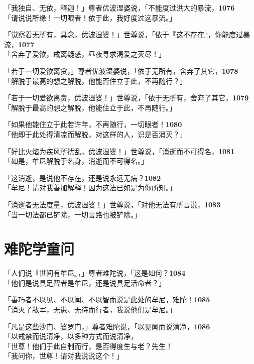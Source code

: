 「我独自、无依，释迦！」尊者优波湿婆说，「不能度过洪大的暴流，\hfill{\grayfootnotesize \textbf{1076}} \\
「请说说所缘！一切眼者！依于此，我好度过这暴流。」


「觉察着无所有，具念，优波湿婆！」世尊说，「依于『这不存在』，你能度过暴流，\hfill{\grayfootnotesize \textbf{1077}} \\
「舍弃了爱欲，戒离疑惑，昼夜寻求渴爱之灭尽！」


「若于一切爱欲离贪，」尊者优波湿婆说，「依于无所有，舍弃了其它，\hfill{\grayfootnotesize \textbf{1078}} \\
「解脱于最高的想之解脱，他能否住立于此，不再随行？」


「若于一切爱欲离贪，优波湿婆！」世尊说，「依于无所有，舍弃了其它，\hfill{\grayfootnotesize \textbf{1079}} \\
「解脱于最高的想之解脱，他能住立于此，不再随行。」


「如果他能住立于此若许年，不再随行，一切眼者！\hfill{\grayfootnotesize \textbf{1080}} \\
「他即于此处得清凉而解脱，对这样的人，识是否消灭？」


「好比火焰为疾风所扰乱，优波湿婆！」世尊说，「消逝而不可得名，\hfill{\grayfootnotesize \textbf{1081}} \\
「如是，牟尼解脱于名身，消逝而不可得名。」


「这消逝，是说他不存在，还是说永远无病？\hfill{\grayfootnotesize \textbf{1082}} \\
「牟尼！请对我善加解释！因为这法已如是为你所知。」


「消逝者无法度量，优波湿婆！」世尊说，「对他无法有所言说，\hfill{\grayfootnotesize \textbf{1083}} \\
「当一切法都已铲除，一切言路也被铲除。」


\section{难陀学童问}

「人们说『世间有牟尼』，」尊者难陀说，「这是如何？\hfill{\grayfootnotesize \textbf{1084}} \\
「他们是说具足智者是牟尼，还是说具足活命者？」


「善巧者不以见、不以闻、不以智而说是此处的牟尼，难陀！\hfill{\grayfootnotesize \textbf{1085}} \\
「消灭了敌军，无患、无待而行者，我说他们是牟尼。」


「凡是这些沙门、婆罗门，」尊者难陀说，「以见闻而说清净，\hfill{\grayfootnotesize \textbf{1086}} \\
「以戒禁而说清净，以多种方式而说清净，\\
「世尊！他们于此自制而行，是否得度生与老？先生！\\
「我问你，世尊！请对我说说这个！」


